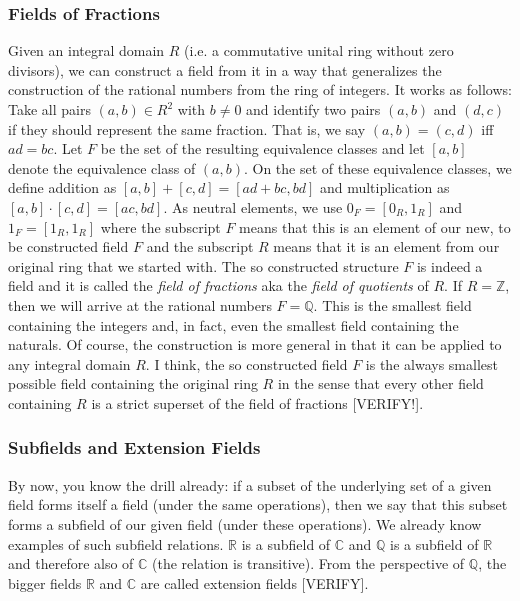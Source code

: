 \subsubsection{Fields of Fractions}
Given an integral domain $R$ (i.e. a commutative unital ring without zero divisors), we can construct a field from it in a way that generalizes the construction of the rational numbers from the ring of integers. It works as follows: Take all pairs $(a,b) \in R^2$ with $b \neq 0$ and identify two pairs $(a,b)$ and $(d,c)$ if they should represent the same fraction. That is, we say $(a,b) = (c,d)$ iff $a d = b c$. Let $F$ be the set of the resulting equivalence classes and let $[a,b]$ denote the equivalence class of $(a,b)$. On the set of these equivalence classes, we define addition as $[a,b] + [c,d] = [a d + bc, bd]$ and multiplication as  $[a,b] \cdot [c,d] = [ac, bd]$. As neutral elements, we use $0_F = [0_R, 1_R]$ and $1_F = [1_R, 1_R]$ where the subscript $F$ means that this is an element of our new, to be constructed field $F$ and the subscript $R$ means that it is an element from our original ring that we started with. The so constructed structure $F$ is indeed a field and it is called the \emph{field of fractions} aka the \emph{field of quotients} of $R$. If $R = \mathbb{Z}$, then we will arrive at the rational numbers $F = \mathbb{Q}$. This is the smallest field containing the integers and, in fact, even the smallest field containing the naturals. Of course, the construction is more general in that it can be applied to any integral domain $R$. I think, the so constructed field $F$ is the always smallest possible field containing the original ring $R$ in the sense that every other field containing $R$ is a strict superset of the field of fractions [VERIFY!]. 



\subsubsection{Subfields and Extension Fields}
By now, you know the drill already: if a subset of the underlying set of a given field forms itself a field (under the same operations), then we say that this subset forms a subfield of our given field (under these operations). We already know examples of such subfield relations. $\mathbb{R}$ is a subfield of $\mathbb{C}$ and $\mathbb{Q}$ is a subfield of $\mathbb{R}$ and therefore also of $\mathbb{C}$ (the relation is transitive). From the perspective of $\mathbb{Q}$, the bigger fields $\mathbb{R}$ and $\mathbb{C}$ are called extension fields [VERIFY]. 

